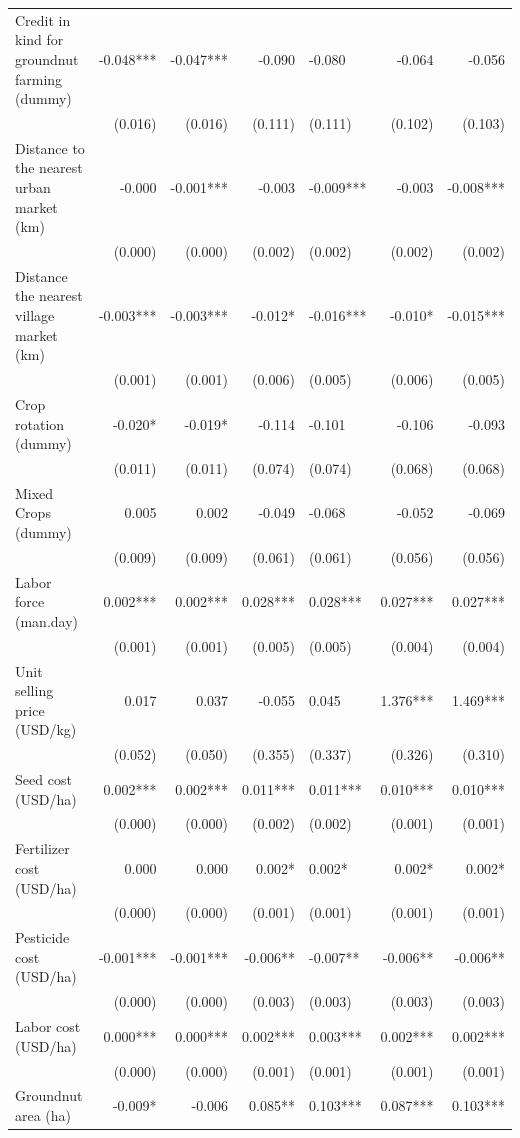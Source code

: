 \documentclass[
]{article}
\begin{document}
\begin{landscape}
\begin{longtable}[t]{lrrrlrr}
Credit in kind for groundnut farming (dummy) & -0.048*** & -0.047*** & -0.090 & -0.080 & -0.064 & -0.056\\
 & (0.016) & (0.016) & (0.111) & (0.111) & (0.102) & (0.103)\\
Distance to the nearest urban market (km) & -0.000 & -0.001*** & -0.003 & -0.009*** & -0.003 & -0.008***\\
 & (0.000) & (0.000) & (0.002) & (0.002) & (0.002) & (0.002)\\
Distance the nearest village market (km) & -0.003*** & -0.003*** & -0.012* & -0.016*** & -0.010* & -0.015***\\
 & (0.001) & (0.001) & (0.006) & (0.005) & (0.006) & (0.005)\\
Crop rotation (dummy) & -0.020* & -0.019* & -0.114 & -0.101 & -0.106 & -0.093\\
 & (0.011) & (0.011) & (0.074) & (0.074) & (0.068) & (0.068)\\
Mixed Crops (dummy) & 0.005 & 0.002 & -0.049 & -0.068 & -0.052 & -0.069\\
 & (0.009) & (0.009) & (0.061) & (0.061) & (0.056) & (0.056)\\
Labor force (man.day) & 0.002*** & 0.002*** & 0.028*** & 0.028*** & 0.027*** & 0.027***\\
 & (0.001) & (0.001) & (0.005) & (0.005) & (0.004) & (0.004)\\
Unit selling price (USD/kg) & 0.017 & 0.037 & -0.055 & 0.045 & 1.376*** & 1.469***\\
 & (0.052) & (0.050) & (0.355) & (0.337) & (0.326) & (0.310)\\
Seed cost (USD/ha) & 0.002*** & 0.002*** & 0.011*** & 0.011*** & 0.010*** & 0.010***\\
 & (0.000) & (0.000) & (0.002) & (0.002) & (0.001) & (0.001)\\
Fertilizer cost (USD/ha) & 0.000 & 0.000 & 0.002* & 0.002* & 0.002* & 0.002*\\
 & (0.000) & (0.000) & (0.001) & (0.001) & (0.001) & (0.001)\\
Pesticide cost (USD/ha) & -0.001*** & -0.001*** & -0.006** & -0.007** & -0.006** & -0.006**\\
 & (0.000) & (0.000) & (0.003) & (0.003) & (0.003) & (0.003)\\
Labor cost (USD/ha) & 0.000*** & 0.000*** & 0.002*** & 0.003*** & 0.002*** & 0.002***\\
 & (0.000) & (0.000) & (0.001) & (0.001) & (0.001) & (0.001)\\
Groundnut area (ha) & -0.009* & -0.006 & 0.085** & 0.103*** & 0.087*** & 0.103***\\

\end{longtable}
\end{landscape}
\end{document}
